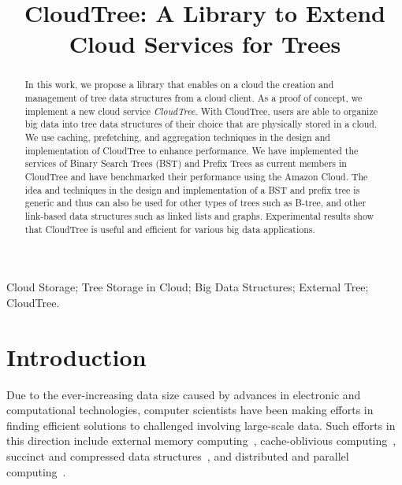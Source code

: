 \documentclass[10pt, conference, compsocconf]{IEEEtran}
\begin{document}
\title{CloudTree: A Library to Extend Cloud Services for Trees}


\author{
} 

\maketitle


\begin{abstract}
In this work, we propose a library that enables on a cloud the creation and
  management of tree data structures from a cloud client. As a proof
  of concept, we implement a new cloud service \emph{CloudTree}.  With
  CloudTree, users are able to organize big data into tree data
  structures of their choice that are physically stored in a cloud.
We use caching, prefetching, and aggregation techniques in the
  design and implementation of CloudTree to enhance performance.
  We have implemented the services of Binary Search Trees (BST) and
  Prefix Trees as current members in CloudTree and have benchmarked
  their performance using the Amazon Cloud. The idea and techniques in
  the design and implementation of a BST and prefix tree is generic and
  thus can also be used for other types of trees such as B-tree, and
  other link-based data structures such as linked lists and graphs. 
  Experimental results show that CloudTree is useful and
  efficient for various big data applications.


\end{abstract}

\begin{IEEEkeywords}
  Cloud Storage; Tree Storage in Cloud; Big Data Structures; External
  Tree; CloudTree.
\end{IEEEkeywords}




\IEEEpeerreviewmaketitle




\section{Introduction}
\label{sec:intro}
Due to the ever-increasing data size caused by advances in
electronic and computational technologies, computer scientists have
been making efforts in finding efficient solutions to challenged involving 
large-scale data. Such efforts in this direction include external memory
computing~\cite{AV1987,vitter:IO-book}, cache-oblivious
computing~\cite{FLPR1999}, succinct and compressed data
structures~\cite{NM2007}, and distributed and parallel computing~\cite{AW2004,GKKG2004}.
\end{document}
